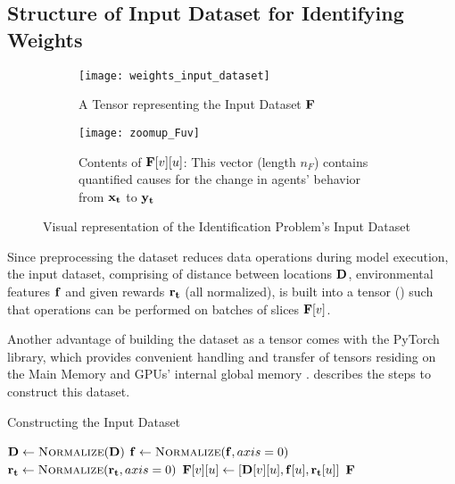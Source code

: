 \subsection{Structure of Input Dataset for Identifying Weights} \label{sec:Structure of Input Dataset for Identifying Weights}
\begin{figure}[!htbp]
    \begin{subfigure}{.64\textwidth}
        \centering
        \texttt{[image: weights\_input\_dataset]}
        \caption{A Tensor representing the Input Dataset $\mathbf{F}$}
        \label{fig:A Tensor representing the complete Input Dataset}
    \end{subfigure}
    \begin{subfigure}{.35\textwidth}
        \centering
        \texttt{[image: zoomup\_Fuv]}
        \caption{Contents of $\mathbf{F}[v][u]$: This vector (length $n_F$) contains quantified causes for the change in agents' behavior from $\mathbf{x_t}$ to $\mathbf{y_t}$}
        \label{fig:Zoomed-in contents of Fvu}
    \end{subfigure}
    \caption{Visual representation of the Identification Problem's Input Dataset}
    \label{fig:Visual representation of the Identification Problem's Input Dataset}
\end{figure}
Since preprocessing the dataset reduces data operations during model execution, the input dataset, comprising of distance between locations $\mathbf{D}$, environmental features $\mathbf{f}$ and given rewards $\mathbf{r_t}$ (all normalized), is built into a tensor () such that operations can be performed on batches of slices $\mathbf{F}[v]$.

Another advantage of building the dataset as a tensor comes with the PyTorch library, which provides convenient handling and transfer of tensors residing on the Main Memory and GPUs' internal global memory \cite{PTDocs}.  describes the steps to construct this dataset.
\begin{algorithm}[!htbp]
    \caption{Constructing the Input Dataset} \label{alg:Constructing the Input Dataset}
    \begin{algorithmic}[1]
        \State $\matr{D} \gets \Call{Normalize}{\matr{D}}$
        \State $\vect{f} \gets \Call{Normalize}{\mathbf{f}, axis = 0}$
        \State $\vect{r_t} \gets \Call{Normalize}{\vect{r_t}, axis = 0}$
                \State $\mathbf{F}[v][u] \gets [\mathbf{D}[v][u], \mathbf{f}[u], \mathbf{r_t}[u]]$ 
             \EndFor
        \EndFor
        \State \Return $\mathbf{F}$
        \EndFunction
    \end{algorithmic}
\end{algorithm}

